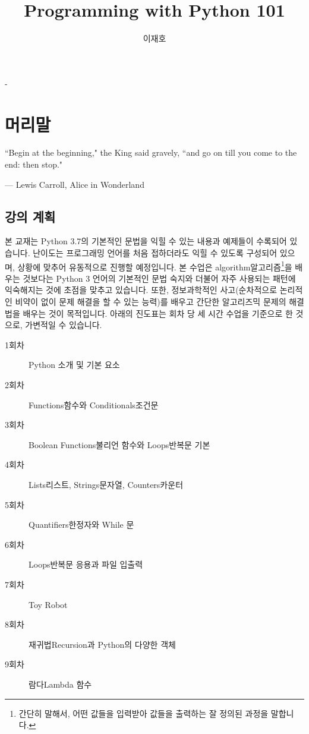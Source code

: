\documentclass[a4paper,10pt]{memoir}
\title{Programming with Python 101}
\author{이재호}
\date{}
\begin{document}
\frontmatter
\begin{titlingpage}
  \setlength{\droptitle}{10.5cm}
  \calccentering{\unitlength}
  \begin{adjustwidth*}{\unitlength}{-\unitlength}
    \maketitle
  \end{adjustwidth*}
\end{titlingpage}

\tableofcontents

\chapter{머리말}
\epigraph{%
  ``Begin at the beginning," the King said gravely, ``and go on till you come to the end: then stop."%
}{--- \textup{Lewis Carroll}, Alice in Wonderland}

\section{강의 계획}
본 교재는 Python 3.7의 기본적인 문법을 익힐 수 있는 내용과 예제들이 수록되어 있습니다.
난이도는 프로그래밍 언어를 처음 접하더라도 익힐 수 있도록 구성되어 있으며, 상황에 맞추어 유동적으로 진행할 예정입니다.
본 수업은 algorithm알고리즘\footnote{간단히 말해서, 어떤 값들을 입력받아 값들을 출력하는 잘 정의된 과정을 말합니다.}을 배우는 것보다는 Python 3 언어의 기본적인 문법 숙지와 더불어 자주 사용되는 패턴에 익숙해지는 것에 초점을 맞추고 있습니다.
또한, 정보과학적인 사고(순차적으로 논리적인 비약이 없이 문제 해결을 할 수 있는 능력)를 배우고 간단한 알고리즈믹 문제의 해결법을 배우는 것이 목적입니다.
아래의 진도표는 회차 당 세 시간 수업을 기준으로 한 것으로, 가변적일 수 있습니다.

\begin{description}
  \item[1회차] Python 소개 및 기본 요소
  \item[2회차] Functions함수와 Conditionals조건문
  \item[3회차] Boolean Functions불리언 함수와 Loops반복문 기본
  \item[4회차] Lists리스트, Strings문자열, Counters카운터
  \item[5회차] Quantifiers한정자와 While 문
  \item[6회차] Loops반복문 응용과 파일 입출력
  \item[7회차] Toy Robot
  \item[8회차] 재귀법Recursion과 Python의 다양한 객체
  \item[9회차] 람다Lambda 함수
\end{description}
\end{document}
